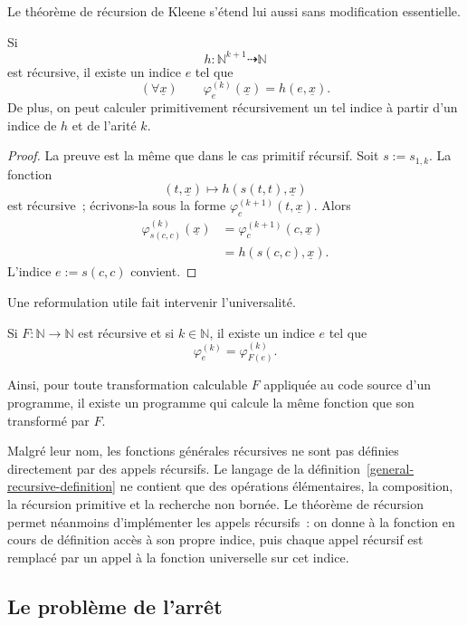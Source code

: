 \thingy Le théorème de récursion de Kleene s'étend lui aussi sans
modification essentielle.

\begin{thm}[Kleene]\label{kleene-recursion-theorem}
Si
\[
h\colon\mathbb{N}^{k+1}\dasharrow\mathbb{N}
\]
est récursive, il existe un indice $e$ tel que
\[
(\forall\underline{x})\qquad
\varphi_e^{(k)}(\underline{x})=h(e,\underline{x}).
\]
De plus, on peut calculer primitivement récursivement un tel indice à
partir d'un indice de $h$ et de l'arité $k$.
\end{thm}

\begin{proof}
La preuve est la même que dans le cas primitif récursif.  Soit
$s:=s_{1,k}$.  La fonction
\[
(t,\underline{x})\mapsto h(s(t,t),\underline{x})
\]
est récursive ; écrivons-la sous la forme
$\varphi_c^{(k+1)}(t,\underline{x})$.  Alors
\[
\begin{aligned}
\varphi_{s(c,c)}^{(k)}(\underline{x})
 &=\varphi_c^{(k+1)}(c,\underline{x})\\
 &=h(s(c,c),\underline{x}).
\end{aligned}
\]
L'indice $e:=s(c,c)$ convient.
\end{proof}

Une reformulation utile fait intervenir l'universalité.

\begin{thm}\label{kleene-rogers-fixed-point}
Si $F\colon\mathbb{N}\to\mathbb{N}$ est récursive et si
$k\in\mathbb{N}$, il existe un indice $e$ tel que
\[
\varphi_e^{(k)}=\varphi_{F(e)}^{(k)}.
\]
\end{thm}

Ainsi, pour toute transformation calculable $F$ appliquée au code
source d'un programme, il existe un programme qui calcule la même
fonction que son transformé par $F$.

\thingy Malgré leur nom, les fonctions générales récursives ne sont pas
définies directement par des appels récursifs.  Le langage de la
définition \ref{general-recursive-definition} ne contient que des
opérations élémentaires, la composition, la récursion primitive et la
recherche non bornée.  Le théorème de récursion permet néanmoins
d'implémenter les appels récursifs : on donne à la fonction en cours de
définition accès à son propre indice, puis chaque appel récursif est
remplacé par un appel à la fonction universelle sur cet indice.

\subsection{Le problème de l'arrêt}
\label{subsection-halting-problem-recursive-functions}

